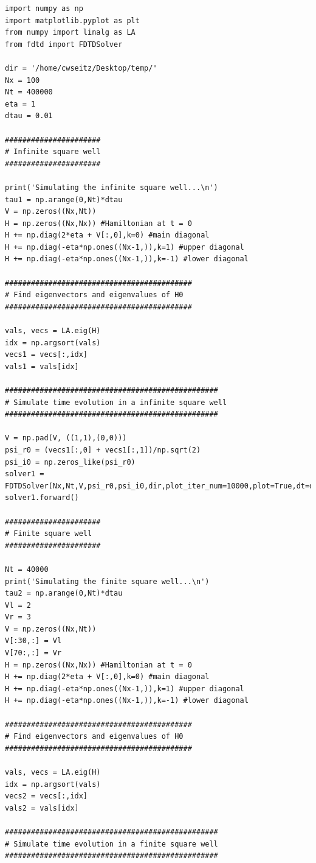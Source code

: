 \documentclass[12pt]{article}
\theoremstyle{definition}
\begin{document}
{\begin{lstlisting}
\end{lstlisting}

\begin{lstlisting}
import numpy as np
import matplotlib.pyplot as plt
from numpy import linalg as LA
from fdtd import FDTDSolver

dir = '/home/cwseitz/Desktop/temp/'
Nx = 100
Nt = 400000
eta = 1
dtau = 0.01

######################
# Infinite square well
######################

print('Simulating the infinite square well...\n')
tau1 = np.arange(0,Nt)*dtau
V = np.zeros((Nx,Nt))
H = np.zeros((Nx,Nx)) #Hamiltonian at t = 0
H += np.diag(2*eta + V[:,0],k=0) #main diagonal
H += np.diag(-eta*np.ones((Nx-1,)),k=1) #upper diagonal
H += np.diag(-eta*np.ones((Nx-1,)),k=-1) #lower diagonal

###########################################
# Find eigenvectors and eigenvalues of H0
###########################################

vals, vecs = LA.eig(H)
idx = np.argsort(vals)
vecs1 = vecs[:,idx]
vals1 = vals[idx]

#################################################
# Simulate time evolution in a infinite square well
#################################################

V = np.pad(V, ((1,1),(0,0)))
psi_r0 = (vecs1[:,0] + vecs1[:,1])/np.sqrt(2)
psi_i0 = np.zeros_like(psi_r0)
solver1 = FDTDSolver(Nx,Nt,V,psi_r0,psi_i0,dir,plot_iter_num=10000,plot=True,dt=dtau,name='inf',H=H)
solver1.forward()

######################
# Finite square well
######################

Nt = 40000
print('Simulating the finite square well...\n')
tau2 = np.arange(0,Nt)*dtau
Vl = 2
Vr = 3
V = np.zeros((Nx,Nt))
V[:30,:] = Vl
V[70:,:] = Vr
H = np.zeros((Nx,Nx)) #Hamiltonian at t = 0
H += np.diag(2*eta + V[:,0],k=0) #main diagonal
H += np.diag(-eta*np.ones((Nx-1,)),k=1) #upper diagonal
H += np.diag(-eta*np.ones((Nx-1,)),k=-1) #lower diagonal

###########################################
# Find eigenvectors and eigenvalues of H0
###########################################

vals, vecs = LA.eig(H)
idx = np.argsort(vals)
vecs2 = vecs[:,idx]
vals2 = vals[idx]

#################################################
# Simulate time evolution in a finite square well
#################################################


\end{lstlisting}}
\end{document}
